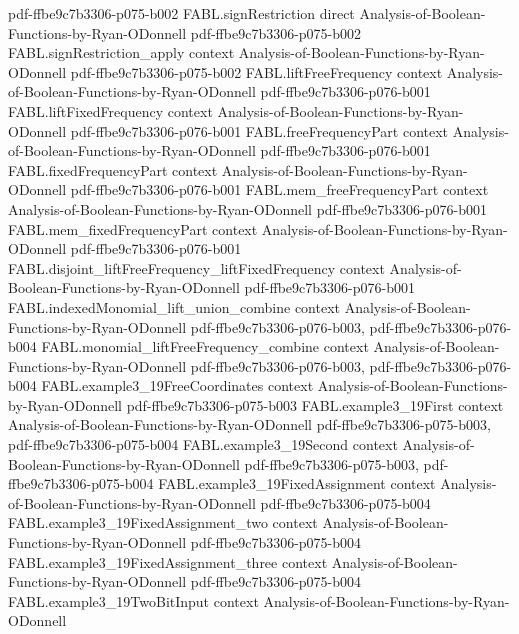\begin{theorem}
  {pdf-ffbe9c7b3306-p075-b002}
\proofstep
  {FABL.signRestriction}
  {direct}
  {Analysis-of-Boolean-Functions-by-Ryan-ODonnell}
  {pdf-ffbe9c7b3306-p075-b002}
\proofstep
  {FABL.signRestriction_apply}
  {context}
  {Analysis-of-Boolean-Functions-by-Ryan-ODonnell}
  {pdf-ffbe9c7b3306-p075-b002}
\proofstep
  {FABL.liftFreeFrequency}
  {context}
  {Analysis-of-Boolean-Functions-by-Ryan-ODonnell}
  {pdf-ffbe9c7b3306-p076-b001}
\proofstep
  {FABL.liftFixedFrequency}
  {context}
  {Analysis-of-Boolean-Functions-by-Ryan-ODonnell}
  {pdf-ffbe9c7b3306-p076-b001}
\proofstep
  {FABL.freeFrequencyPart}
  {context}
  {Analysis-of-Boolean-Functions-by-Ryan-ODonnell}
  {pdf-ffbe9c7b3306-p076-b001}
\proofstep
  {FABL.fixedFrequencyPart}
  {context}
  {Analysis-of-Boolean-Functions-by-Ryan-ODonnell}
  {pdf-ffbe9c7b3306-p076-b001}
\proofstep
  {FABL.mem_freeFrequencyPart}
  {context}
  {Analysis-of-Boolean-Functions-by-Ryan-ODonnell}
  {pdf-ffbe9c7b3306-p076-b001}
\proofstep
  {FABL.mem_fixedFrequencyPart}
  {context}
  {Analysis-of-Boolean-Functions-by-Ryan-ODonnell}
  {pdf-ffbe9c7b3306-p076-b001}
\proofstep
  {FABL.disjoint_liftFreeFrequency_liftFixedFrequency}
  {context}
  {Analysis-of-Boolean-Functions-by-Ryan-ODonnell}
  {pdf-ffbe9c7b3306-p076-b001}
\proofstep
  {FABL.indexedMonomial_lift_union_combine}
  {context}
  {Analysis-of-Boolean-Functions-by-Ryan-ODonnell}
  {pdf-ffbe9c7b3306-p076-b003,
    pdf-ffbe9c7b3306-p076-b004}
\proofstep
  {FABL.monomial_liftFreeFrequency_combine}
  {context}
  {Analysis-of-Boolean-Functions-by-Ryan-ODonnell}
  {pdf-ffbe9c7b3306-p076-b003,
    pdf-ffbe9c7b3306-p076-b004}
\proofstep
  {FABL.example3_19FreeCoordinates}
  {context}
  {Analysis-of-Boolean-Functions-by-Ryan-ODonnell}
  {pdf-ffbe9c7b3306-p075-b003}
\proofstep
  {FABL.example3_19First}
  {context}
  {Analysis-of-Boolean-Functions-by-Ryan-ODonnell}
  {pdf-ffbe9c7b3306-p075-b003,
    pdf-ffbe9c7b3306-p075-b004}
\proofstep
  {FABL.example3_19Second}
  {context}
  {Analysis-of-Boolean-Functions-by-Ryan-ODonnell}
  {pdf-ffbe9c7b3306-p075-b003,
    pdf-ffbe9c7b3306-p075-b004}
\proofstep
  {FABL.example3_19FixedAssignment}
  {context}
  {Analysis-of-Boolean-Functions-by-Ryan-ODonnell}
  {pdf-ffbe9c7b3306-p075-b004}
\proofstep
  {FABL.example3_19FixedAssignment_two}
  {context}
  {Analysis-of-Boolean-Functions-by-Ryan-ODonnell}
  {pdf-ffbe9c7b3306-p075-b004}
\proofstep
  {FABL.example3_19FixedAssignment_three}
  {context}
  {Analysis-of-Boolean-Functions-by-Ryan-ODonnell}
  {pdf-ffbe9c7b3306-p075-b004}
\proofstep
  {FABL.example3_19TwoBitInput}
  {context}
  {Analysis-of-Boolean-Functions-by-Ryan-ODonnell}

\end{theorem}
